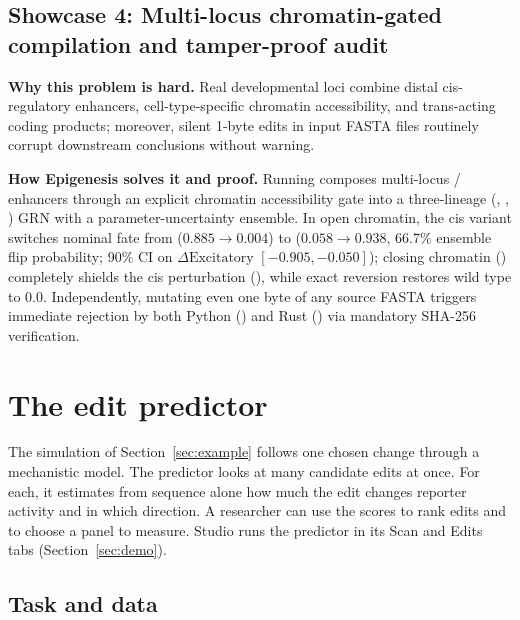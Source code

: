 \documentclass[10.5pt,a4paper]{article}
\begin{document}
\subsection{Showcase 4: Multi-locus chromatin-gated compilation and tamper-proof audit}

\textbf{Why this problem is hard.} Real developmental loci combine distal cis-regulatory enhancers, cell-type-specific chromatin accessibility, and trans-acting coding products; moreover, silent 1-byte edits in input FASTA files routinely corrupt downstream conclusions without warning.

\textbf{How Epigenesis solves it and proof.} Running  composes multi-locus / enhancers through an explicit chromatin accessibility gate into a three-lineage (, , ) GRN with a parameter-uncertainty ensemble. In open chromatin, the cis variant switches nominal fate from  ($0.885\rightarrow 0.004$) to  ($0.058\rightarrow 0.938$, 66.7\% ensemble flip probability; 90\% CI on $\Delta\text{Excitatory}$ $[-0.905, -0.050]$); closing chromatin () completely shields the cis perturbation (), while exact reversion restores wild type to $0.0$. Independently, mutating even one byte of any source FASTA triggers immediate rejection by both Python () and Rust () via mandatory  SHA-256 verification.

\section{The edit predictor}\label{sec:predictor}

The simulation of Section~\ref{sec:example} follows one chosen change through a mechanistic model. The predictor looks at many candidate edits at once. For each, it estimates from sequence alone how much the edit changes reporter activity and in which direction. A researcher can use the scores to rank edits and to choose a panel to measure. Studio runs the predictor in its Scan and Edits tabs (Section~\ref{sec:demo}).

\subsection{Task and data}\label{sec:data}
\end{document}
